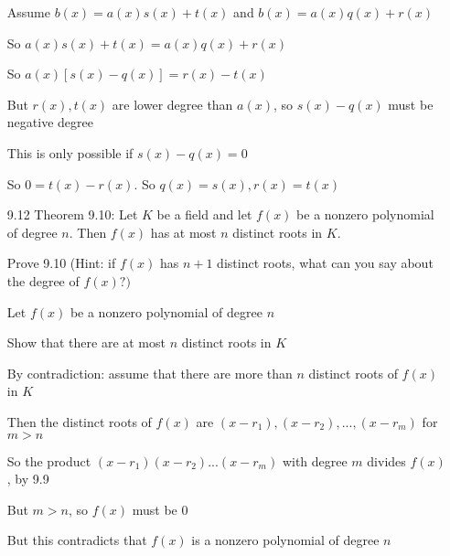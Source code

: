 \documentclass[12pt]{article}
\begin{document}
\begin{itemize}
	Assume $b(x) = a(x)s(x) + t(x)$ and $b(x) = a(x)q(x) + r(x)$

	So $a(x)s(x) + t(x) = a(x)q(x) + r(x)$

	So $a(x)[s(x) - q(x)] = r(x) - t(x)$

	But $r(x), t(x)$ are lower degree than $a(x)$, so $s(x) - q(x)$ must be negative degree

	This is only possible if $s(x) - q(x) = 0$

	So $0 = t(x) - r(x)$. So $q(x) = s(x), r(x) = t(x)$

  \newpage

\item[9.12]
  Theorem 9.10: Let $K$ be a field and let $f(x)$ be a nonzero polynomial of degree $n$. Then $f(x)$ has at most $n$ distinct roots in $K$.

  Prove 9.10 (Hint: if $f(x)$ has $n + 1$ distinct roots, what can you say about the degree of $f(x)?)$

  Let $f(x)$ be a nonzero polynomial of degree $n$

  Show that there are at most $n$ distinct roots in $K$

  By contradiction: assume that there are more than $n$ distinct roots of $f(x)$ in $K$

  Then the distinct roots of $f(x)$ are $(x-r_1),(x-r_2), ..., (x-r_{m})$ for $m > n$
    
  So the product $(x-r_1)(x-r_2)...(x-r_m)$ with degree $m$ divides $f(x)$, by 9.9

  But $m > n$, so $f(x)$ must be 0

  But this contradicts that $f(x)$ is a nonzero polynomial of degree $n$
\end{itemize}
\end{document}
